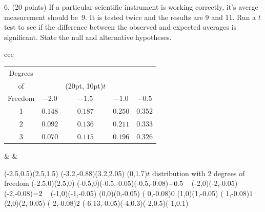 \documentclass[10pt]{article}
\begin{document}
\vfill
\eject

6. (20 points) If a  particular scientific instrument is working correctly, it's averge measurement
should be~9.  It is tested twice and the results are 9 and 11.  Run a $t$ test to see if the
difference between the observed and expected averages is significant.  State the null and alternative hypotheses.


\vfill
\begin{tabular}{ccc}
\begin{tabular}{|c|cccc|}\hline
Degrees\vphantom{\LARGE Y} & &&&\\
of      & &\rput(20pt, 10pt){$t$}&&\\
Freedom & $-2.0$ & $-1.5$ & $-1.0$ & $-0.5$\\[3pt]\hline
1       & $0.148$ & $0.187$ & $0.250$ & $0.352$\vphantom{\LARGE Y}\\
2       & $0.092$ & $0.136$ & $0.211$ & $0.333$\\
3       & $0.070$ & $0.115$ & $0.196$ & $0.326$\\\hline
\end{tabular}
&\hspace{1in} &
\begin{pspicture}(-2.5,0.5)(2.5,1.5)
\psframe[linewidth=0.02](-3.2,-0.88)(3.2,2.05)
\rput(0,1.7){$t$ distribution with $2$ degrees of freedom}
\psline{<->}(-2.5,0)(2.5,0)
\psline(-0.5,0)(-0.5,-0.05)\rput[t](-0.5,-0.08){\footnotesize$-0.5\hphantom{-}$}
\psline(-2,0)(-2,-0.05)    \rput[t](-2,-0.08){\footnotesize$-2\hphantom{-}$}
\psline(-1,0)(-1,-0.05)   %
\psline(0,0)(0,-0.05)      \rput[t]( 0,-0.08){\footnotesize$0$}
\psline(1,0)(1,-0.05)      \rput[t]( 1,-0.08){\footnotesize$1$}
\psline(2,0)(2,-0.05)      \rput[t]( 2,-0.08){\footnotesize$2$}
\psbezier{->}(-6.13,-0.05)(-4,0.3)(-2,0.5)(-1,0.1)
\end{pspicture}
\end{tabular}

\eject
\end{document}
